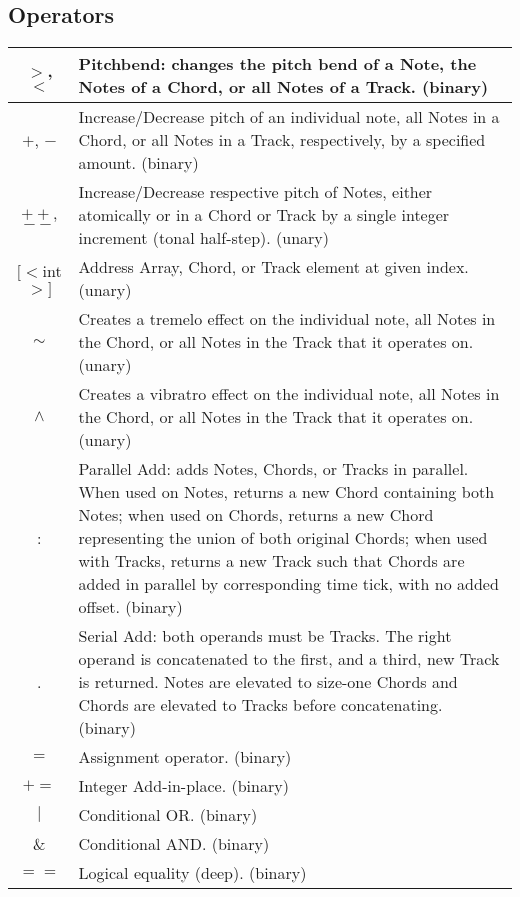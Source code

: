 \documentclass[letterpaper]{article}
\begin{document}
\begin{samepage}
\subsection{Operators}
\begin{table}[H]
\centering
\begin{tabularx}{.75\textwidth}{|c|X|}
\hline
$>$, $<$ & Pitchbend: changes the pitch bend of a Note, the Notes of a Chord, or all Notes of a Track. (binary) \\
\hline
$+$, $-$ & Increase/Decrease pitch of an individual note, all Notes in a Chord, or all Notes in a Track, respectively, by a specified amount. (binary) \\
\hline
$++$, $--$ & Increase/Decrease respective pitch of Notes, either atomically or in a Chord or Track by a single integer increment (tonal half-step). (unary) \\
\hline
$[<$int$>]$ & Address Array, Chord, or Track element at given index. (unary) \\
\hline
$\sim$ & Creates a tremelo effect on the individual note, all Notes in the Chord, or all Notes in the Track that it operates on. (unary) \\
\hline
$\wedge$ & Creates a vibratro effect on the individual note, all Notes in the Chord, or all Notes in the Track that it operates on. (unary) \\
\hline
: & Parallel Add: adds Notes, Chords, or Tracks in parallel. When used on Notes, returns a new Chord containing both Notes; when used on Chords, returns a new Chord representing the union of both original Chords; when used with Tracks, returns a new Track such that Chords are added in parallel by corresponding time tick, with no added offset. (binary) \\
\hline
. & Serial Add: both operands must be Tracks. The right operand is concatenated to the first, and a third, new  Track is returned. Notes are elevated to size-one Chords and Chords are elevated to Tracks before concatenating. (binary) \\
\hline
$=$ & Assignment operator. (binary) \\
\hline
$+=$ & Integer Add-in-place. (binary)\\
\hline
$|$ & Conditional OR. (binary)\\
\hline
\& & Conditional AND. (binary)\\
\hline
$==$ & Logical equality (deep). (binary) \\
\hline
\end{tabularx}
\end{table}
\end{samepage}
\end{document}
